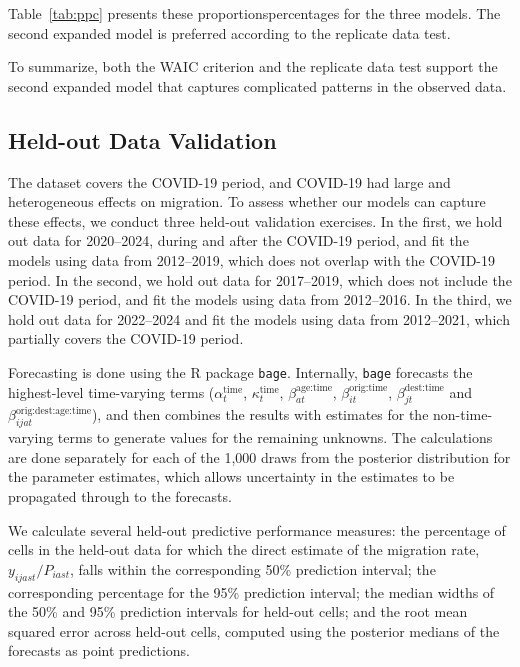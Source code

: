 \documentclass{article}
\begin{document}
{Table~\ref{tab:ppc} presents these {\color{yellow}proportions}{\color{magenta}percentages} for the three models. The second expanded model is preferred according to the replicate data test.



{\color{yellow}To summarize, both the WAIC criterion and the replicate data test support the second expanded model that captures complicated patterns in the observed data.
}


\subsection{{\color{magenta}Held-out Data Validation}}

{\color{magenta}The dataset covers the COVID-19 period, and COVID-19 had large and heterogeneous effects on migration. To assess whether our models can capture these effects, we conduct three held-out validation exercises. In the first, we hold out data for 2020–2024, during and after the COVID-19 period, and fit the models using data from 2012–2019, which does not overlap with the COVID-19 period. In the second, we hold out data for 2017–2019, which does not include the COVID-19 period, and fit the models using data from 2012–2016. In the third, we hold out data for 2022–2024 and fit the models using data from 2012–2021, which partially covers the COVID-19 period.}

{\color{magenta}Forecasting is done using the R package \texttt{bage}. Internally, \texttt{bage} forecasts the highest-level time-varying terms ($\alpha_t^{\text{time}}$, $\kappa_t^{\text{time}}$,  $\beta_{at}^{\text{age:time}}$, $\beta_{it}^{\text{orig:time}}$,
$\beta_{jt}^{\text{dest:time}}$ and $\beta_{ijat}^{\text{orig:dest:age:time}}$), and then combines the results with estimates for the non-time-varying terms to generate values for the remaining unknowns. The calculations are done separately for each of the 1,000 draws from the posterior distribution for the parameter estimates, which allows uncertainty in the estimates to be propagated through to the forecasts.}

{\color{magenta}We calculate several held-out predictive performance measures: the percentage of cells in the held-out data for which the direct estimate of the migration rate, 
$y_{ijast}/P_{iast}$, falls within the corresponding 50\% prediction interval; the corresponding percentage for the 95\% prediction interval; the median widths of the 50\% and 95\% prediction intervals for held-out cells; and the root mean squared error across held-out cells, computed using the posterior medians of the forecasts as point predictions.}

}
\end{document}
